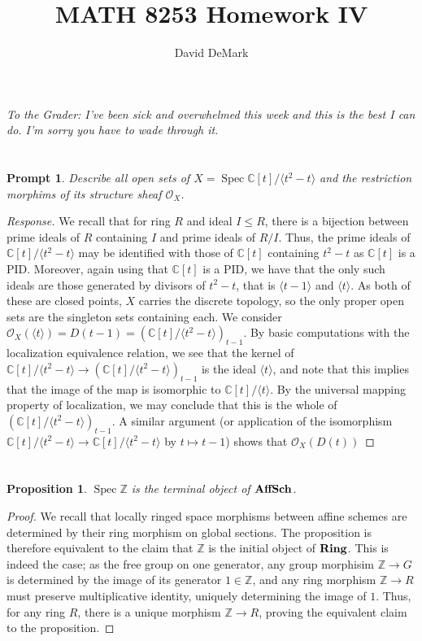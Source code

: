\documentclass[english]{article}
\title{MATH 8253 Homework IV}
\author{David DeMark}
\date{\due}
\DeclareMathOperator{\spec}{Spec}
\newcommand{\CC}{\mathbb{C}}
\newcommand{\ZZ}{\mathbb{Z}}
\newcommand{\OO}{\mathcal{O}}
\newcommand{\prob}[1]{\setcounter{section}{#1-1}\section{}}
\newtheorem*{proposition*}{Proposition}
\newtheorem*{prompt*}{Prompt}
\theoremstyle{remark}
\theoremstyle{definition}
\newcommand{\idl}[1]{\langle #1 \rangle}
\newcommand{\cat}[1]{{\mathrm{\bf{#1}}}}
\begin{document}
\maketitle\emph{To the Grader: I've been sick and overwhelmed this week and this is the best I can do. I'm sorry you have to wade through it.}
\prob{1} \begin{prompt*}
Describe all open sets of $X=\spec \CC[t]/\langle t^2-t\rangle$ and the restriction morphims of its structure sheaf $\OO_X$.
\end{prompt*}
\begin{proof}[Response]
	We recall that for ring $R$ and ideal $I\leq R$, there is a bijection between prime ideals of $R$ containing $I$ and prime ideals of $R/I$. Thus, the prime ideals of $\CC[t]/\langle  t^2-t\rangle$ may be identified with those of $\CC[t]$ containing $t^2-t$ as $\CC[t]$ is a PID. Moreover, again using that $\CC[t]$ is a PID, we have that the only such ideals are those generated by divisors of $t^2-t$, that is $\idl{t-1}$ and $\idl{t}$. As both of these are closed points, $X$ carries the discrete topology, so the only proper open sets are the singleton sets containing each. We consider $\OO_X(\idl{t})=D(t-1)=\left(\CC[t]/\idl{t^2-t}\right)_{t-1}$. By basic computations with the localization equivalence relation, we see that the kernel of $\CC[t]/\idl{t^2-t}\to \left(\CC[t]/\idl{t^2-t}\right)_{t-1}$ is the ideal $\idl{t}$, and note that this implies that the image of the map is isomorphic to $\CC[t]/\idl{t}$. By the universal mapping property of localization, we may conclude that this is the whole of $\left(\CC[t]/\idl{t^2-t}\right)_{t-1}$. A similar argument (or application of the isomorphism $\CC[t]/\idl{t^2-t}\to\CC[t]/\idl{t^2-t}$ by $t\mapsto t-1$) shows that $\OO_X(D(t))$
\end{proof}
\prob{2}
\begin{proposition*}
	$\spec \ZZ$ is the terminal object of $\cat{AffSch}$.
\end{proposition*}
\begin{proof}
We recall that locally ringed space morphisms between affine schemes are determined by their ring morphism on global sections. The proposition is therefore equivalent to the claim that $\ZZ$ is the initial object of $\cat{Ring}$. This is indeed the case; as the free group on one generator, any group morphisim $\ZZ\to G$ is determined by the image of its generator $1\in \ZZ$, and any ring morphism $\ZZ\to R$ must preserve multiplicative identity, uniquely determining the image of $1$. Thus, for any ring $R$, there is a unique morphism $\ZZ\to R$, proving the equivalent claim to the proposition.
\end{proof}
\end{document}
